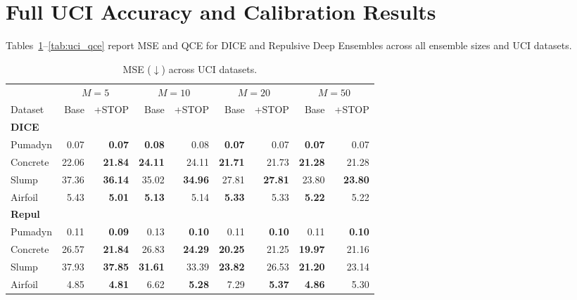 \documentclass[sigconf]{acmart}
\begin{document}




\appendix

\section{Full UCI Accuracy and Calibration Results}
\label{app:uci_results}

Tables~\ref{tab:uci_mse}--\ref{tab:uci_qce} report MSE and QCE for DICE and Repulsive Deep Ensembles across all ensemble sizes and UCI datasets.

\begin{table}[!ht]
\centering
\caption{MSE ($\downarrow$) across UCI datasets.}
\label{tab:uci_mse}
\scriptsize
\setlength{\tabcolsep}{3pt}
\begin{tabular}{lrrrrrrrr}
\toprule
& \multicolumn{2}{c}{$M=5$}
& \multicolumn{2}{c}{$M=10$}
& \multicolumn{2}{c}{$M=20$}
& \multicolumn{2}{c}{$M=50$} \\
\cmidrule(lr){2-3} \cmidrule(lr){4-5}
\cmidrule(lr){6-7} \cmidrule(lr){8-9}
Dataset
& Base & +STOP
& Base & +STOP
& Base & +STOP
& Base & +STOP \\
\midrule

\multicolumn{9}{l}{\textbf{DICE}} \\
Pumadyn  & 0.07 & \textbf{0.07} & \textbf{0.08} & 0.08 & \textbf{0.07} & 0.07 & \textbf{0.07} & 0.07 \\
Concrete & 22.06 & \textbf{21.84} & \textbf{24.11} & 24.11 & \textbf{21.71} & 21.73 & \textbf{21.28} & 21.28 \\
Slump    & 37.36 & \textbf{36.14} & 35.02 & \textbf{34.96} & 27.81 & \textbf{27.81} & 23.80 & \textbf{23.80} \\
Airfoil  & 5.43 & \textbf{5.01} & \textbf{5.13} & 5.14 & \textbf{5.33} & 5.33 & \textbf{5.22} & 5.22 \\

\midrule

\multicolumn{9}{l}{\textbf{Repul}} \\
Pumadyn  & 0.11 & \textbf{0.09} & 0.13 & \textbf{0.10} & 0.11 & \textbf{0.10} & 0.11 & \textbf{0.10} \\
Concrete & 26.57 & \textbf{21.84} & 26.83 & \textbf{24.29} & \textbf{20.25} & 21.25 & \textbf{19.97} & 21.16 \\
Slump    & 37.93 & \textbf{37.85} & \textbf{31.61} & 33.39 & \textbf{23.82} & 26.53 & \textbf{21.20} & 23.14 \\
Airfoil  & 4.85 & \textbf{4.81} & 6.62 & \textbf{5.28} & 7.29 & \textbf{5.37} & \textbf{4.86} & 5.30 \\

\bottomrule
\end{tabular}
\end{table}
\end{document}
